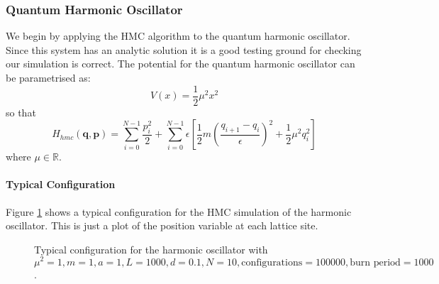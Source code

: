 \documentclass[12pt]{article}
\begin{document}
         
            

    
        \subsubsection{Quantum Harmonic Oscillator}
            \label{sec:QuantumHarmonicOscillator}
            We begin by applying the HMC algorithm to the quantum harmonic oscillator. Since this system has an analytic solution it is a good testing ground for checking our simulation is correct. The potential for the quantum harmonic oscillator can be parametrised as:
            \begin{equation}
                \label{eq:HarmonicPotential}
                V\left(x\right) = \frac{1}{2}\mu^2x^2
            \end{equation}
            so that 
            \begin{equation}
                \label{eq:HarmonicHMCHamiltonian}
                H_{hmc}\left(\bm{q},\bm{p}\right) = \sum_{i=0}^{N-1} \frac{p_i^2}{2} + \sum_{i=0}^{N-1} \epsilon \left[\frac{1}{2}m\left(\frac{q_{i+1}-q_{i}}{\epsilon}\right)^2 + \frac{1}{2}\mu^2q_i^2\right]
            \end{equation}
            where $\mu \in \mathbb{R}$.

            \paragraph{Typical Configuration}
                Figure \ref{fig:TypicalHarmonicPath} shows a typical configuration for the HMC simulation of the harmonic oscillator. This is just a plot of the position variable at each lattice site. 
                \begin{figure}
                    \centering
                        \caption{Typical configuration for the harmonic oscillator with $\mu^2 = 1, m = 1, a = 1, L = 1000, d = 0.1, N = 10, \text{configurations} = 100000, \text{burn period} = 1000$.}
                        \label{fig:TypicalHarmonicPath}
                \end{figure}
\end{document}
